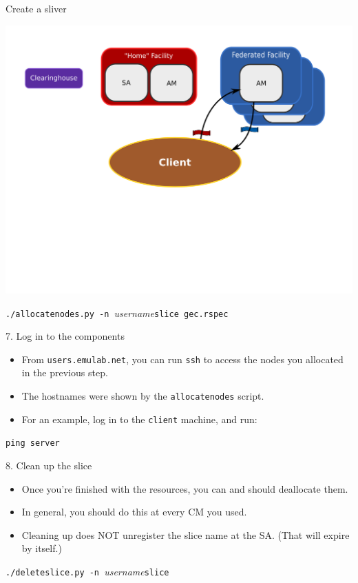 \documentclass[landscape]{slides}
\newcommand{\heading}[1]{{\fontseries{b}\selectfont\begin{center}{\LARGE\color{red} #1}\end{center}}}
\newcommand{\code}[1]{\begin{center}{\tt #1}\end{center}}
\begin{document}
\begin{slide}
\heading{Create a sliver}
\begin{center}
\includegraphics[width=15cm]{tutorial-diagram-5}
\end{center}
\vspace{-4cm}
\begin{center}{\tt ./allocatenodes.py -n }\emph{username}{\tt slice gec.rspec}\end{center}
\end{slide}

\begin{slide}
\heading{7. Log in to the components}
\begin{itemize}
\item From {\tt users.emulab.net}, you can run {\tt ssh} to access the
  nodes you allocated in the previous step.
\item The hostnames were shown by the {\tt allocatenodes} script.
\item For an example, log in to the {\tt client} machine, and run:
\end{itemize}
\code{ping server}
\end{slide}

\begin{slide}
\heading{8. Clean up the slice}
\begin{itemize}
\item Once you're finished with the resources, you can and should deallocate
  them.
\item In general, you should do this at every CM you used.
\item Cleaning up does NOT unregister the slice name at the SA.  (That will
  expire by itself.)
\end{itemize}
\begin{center}{\tt ./deleteslice.py -n }\emph{username}{\tt slice}\end{center}
\end{slide}
\end{document}
